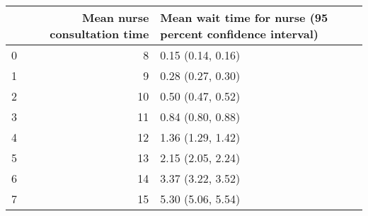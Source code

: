 \begin{tabular}{lrl}
\toprule
 & Mean nurse consultation time & Mean wait time for nurse (95 percent confidence interval) \\
\midrule
0 & 8 & 0.15 (0.14, 0.16) \\
1 & 9 & 0.28 (0.27, 0.30) \\
2 & 10 & 0.50 (0.47, 0.52) \\
3 & 11 & 0.84 (0.80, 0.88) \\
4 & 12 & 1.36 (1.29, 1.42) \\
5 & 13 & 2.15 (2.05, 2.24) \\
6 & 14 & 3.37 (3.22, 3.52) \\
7 & 15 & 5.30 (5.06, 5.54) \\
\bottomrule
\end{tabular}
